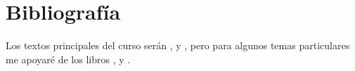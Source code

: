 \documentclass[10pt]{extreport}
\begin{document}
\section{Bibliografía}
Los textos principales del curso serán
\cite{Friedb}, \cite{Hugo} y \cite{ladr}, 
pero para algunos temas particulares me apoyaré de los libros
\cite{Brown}, \cite{Golan} y \cite{Godement}.














\newpage





\printbibliography
\end{document}
